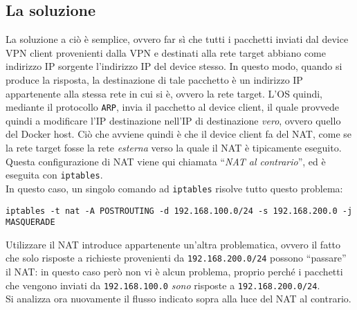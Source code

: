 \subsection{La soluzione}
La soluzione a ciò è semplice, ovvero far sì che tutti i pacchetti inviati dal
device VPN client provenienti dalla VPN e destinati alla rete target abbiano come
indirizzo IP sorgente l'indirizzo IP del device stesso. In questo modo, quando si
produce la risposta, la destinazione di tale pacchetto è un indirizzo IP appartenente
alla stessa rete in cui si è, ovvero la rete target. L'OS quindi, mediante il protocollo
\texttt{ARP}, invia il pacchetto al device client, il quale provvede quindi a modificare
l'IP destinazione nell'IP di destinazione \textit{vero}, ovvero quello del Docker host.
Ciò che avviene quindi è che il device client fa del NAT, come se la rete target
fosse la rete \textit{esterna} verso la quale il NAT è tipicamente eseguito. Questa
configurazione di NAT viene qui chiamata ``\textit{NAT al contrario}'', ed è eseguita con
\texttt{iptables}.\\
In questo caso, un singolo comando ad \texttt{iptables} risolve tutto questo problema:
\begin{verbatim}
iptables -t nat -A POSTROUTING -d 192.168.100.0/24 -s 192.168.200.0 -j MASQUERADE
\end{verbatim}
Utilizzare il NAT introduce appartenente un'altra problematica, ovvero il fatto che
solo risposte a richieste provenienti da \texttt{192.168.200.0/24} possono ``passare''
il NAT: in questo caso però non vi è alcun problema, proprio perché i pacchetti che
vengono inviati da \texttt{192.168.100.0} \textit{sono} risposte a
\texttt{192.168.200.0/24}.\\
Si analizza ora nuovamente il flusso indicato sopra alla luce del NAT al contrario.
